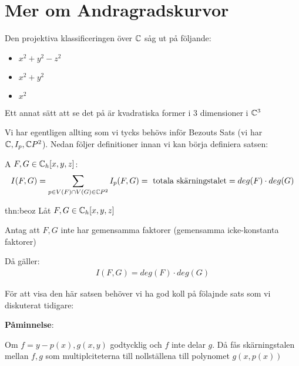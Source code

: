 \section{Mer om Andragradskurvor}\par
\noindent Den projektiva klassificeringen över $\mathbb{C}$ såg ut på följande:
\begin{itemize}
  \item $x^2+y^2-z^2$
  \item $x^2+y^2$
  \item $x^2$
\end{itemize}
\par\bigskip
\noindent Ett annat sätt att se det på är kvadratiska former i 3 dimensioner i $\mathbb{C}^3$
\par\bigskip
\noindent Vi har egentligen allting som vi tycks behövs inför Bezouts Sats (vi har $\mathbb{C}, I_p, \mathbb{C} P^2$). Nedan följer definitioner innan vi kan börja definiera satsen:
\par\bigskip
\begin{theo}
  A $F,G\in\mathbb{C}_h[x,y,z]$:
  \begin{equation*}
    \begin{gathered}
      I(F,G) = \sum_{p\in V(F)\cap V(G)\in\mathbb{C} P^2} I_p(F,G)=\text{ totala skärningstalet} = deg(F)\cdot deg(G)
    \end{gathered}
  \end{equation*}
\end{theo}
\par\bigskip
\begin{theo}{thn:beoz}
  Låt $F,G\in\mathbb{C}_h[x,y,z]$\par
  \noindent Antag att $F,G$ inte har gemensamma faktorer (gemensamma icke-konstanta faktorer)\par 
  \noindent Då gäller:
  \begin{equation*}
    \begin{gathered}
      I(F,G) = deg(F)\cdot deg(G)
    \end{gathered}
  \end{equation*}
\end{theo}
\par\bigskip
\noindent För att visa den här satsen behöver vi ha god koll på fölajnde sats som vi diskuterat tidigare:
\par\bigskip
\noindent\textbf{Påminnelse}:\par
\noindent Om $f = y-p(x), g(x,y)$ godtycklig och $f$ inte delar $g$. Då fås skärningstalen mellan $f,g$ som multiplciteterna till nollställena till polynomet $g(x,p(x))$
